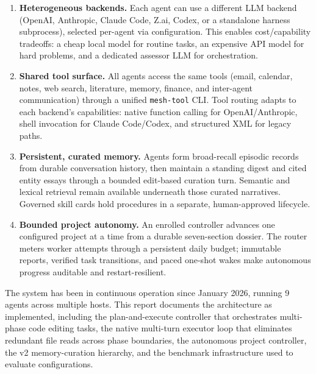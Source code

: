 \documentclass[11pt,letterpaper]{report}
\newcommand{\code}[1]{\texttt{#1}}
\begin{document}
\begin{enumerate}
  \item \textbf{Heterogeneous backends.} Each agent can use a different
        LLM backend (OpenAI, Anthropic, Claude Code, Z.ai, Codex, or a
        standalone harness subprocess), selected per-agent via
        configuration. This enables cost/capability tradeoffs: a cheap
        local model for routine tasks, an expensive API model for hard
        problems, and a dedicated assessor LLM for orchestration.

  \item \textbf{Shared tool surface.} All agents access the same
        tools (email, calendar, notes, web search, literature, memory,
        finance, and inter-agent communication) through a unified
        \code{mesh-tool} CLI. Tool routing adapts to each backend's
        capabilities: native function calling for OpenAI/Anthropic, shell
        invocation for Claude Code/Codex, and structured XML for legacy
        paths.

  \item \textbf{Persistent, curated memory.} Agents form broad-recall
        episodic records from durable conversation history, then maintain
        a standing digest and cited entity essays through a bounded
        edit-based curation turn. Semantic and lexical retrieval remain
        available underneath those curated narratives. Governed skill
        cards hold procedures in a separate, human-approved lifecycle.

  \item \textbf{Bounded project autonomy.} An enrolled controller advances
        one configured project at a time from a durable seven-section
        dossier. The router meters worker attempts through a persistent
        daily budget; immutable reports, verified task transitions, and
        paced one-shot wakes make autonomous progress auditable and
        restart-resilient.
\end{enumerate}

The system has been in continuous operation since January 2026, running
9 agents across multiple hosts. This report documents the architecture
as implemented, including the plan-and-execute controller that
orchestrates multi-phase code editing tasks, the native multi-turn
executor loop that eliminates redundant file reads across phase
boundaries, the autonomous project controller, the v2 memory-curation
hierarchy, and the benchmark infrastructure used to evaluate
configurations.
\end{document}
